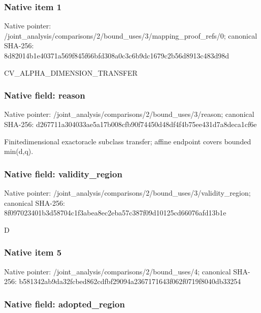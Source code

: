 \documentclass[10pt,a4paper]{article}
\begin{document}
\subsubsection{Native item 1}


Native pointer: /joint\_analysis/comparis\allowbreak{}ons/2/bound\_uses/3/mappi\allowbreak{}ng\_proof\_refs/0; canonical SHA-256: 8d82014b1e40371a569f845f\allowbreak{}66bfd308a0c3c6b9dc1679c2\allowbreak{}b56d8913c483d98d


CV\_ALPHA\_DIMENSION\_TRANSFER


\subsubsection{Native field: reason}


Native pointer: /joint\_analysis/comparis\allowbreak{}ons/2/bound\_uses/3/reaso\allowbreak{}n; canonical SHA-256: d267711a304033ae5a17b008\allowbreak{}cfb90f74450d48df4f4b75ee\allowbreak{}431d7a8deca1cf6e


Finitedimensional exactoracle subclass transfer; affine endpoint covers bounded min(d,q).


\subsubsection{Native field: validity\_region}


Native pointer: /joint\_analysis/comparis\allowbreak{}ons/2/bound\_uses/3/valid\allowbreak{}ity\_region; canonical SHA-256: 8f097023401b3d58704c1f3a\allowbreak{}bea8ec2eba57c387f09d1012\allowbreak{}5cd66076afd13b1e


D


\subsubsection{Native item 5}


Native pointer: /joint\_analysis/comparis\allowbreak{}ons/2/bound\_uses/4; canonical SHA-256: b581342ab9da32fcbed862cd\allowbreak{}fbf29094a2367171643f062f\allowbreak{}0719f8040db33254



\subsubsection{Native field: adopted\_region}
\end{document}
